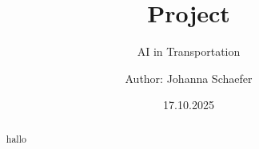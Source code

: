 



	\title{Project}
	\subtitle{AI in Transportation}
	\author{Author: Johanna Schaefer}
	\date{17.10.2025}
	\maketitle
	\vspace{3cm}
	
	\thispagestyle{empty}	%
	
	
	\thispagestyle{empty}
	
	
	
	\thispagestyle{empty}
	\cleardoublepage
	\thispagestyle{empty}
	\newpage
	\begin{abstract}
			hallo
	\end{abstract}


	\newpage
	\tableofcontents
	\thispagestyle{empty}	%

	\newpage
	\setcounter{page}{1}	%
	


